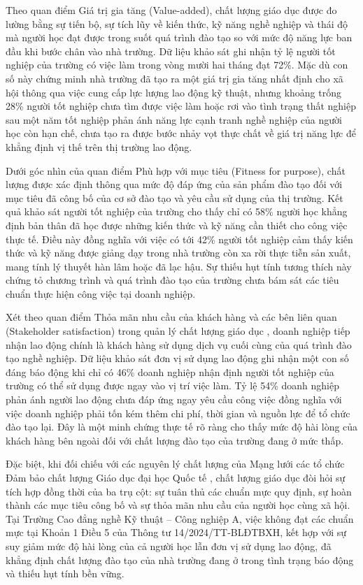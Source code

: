 Theo quan điểm Giá trị gia tăng (Value-added), chất lượng giáo dục được đo lường bằng sự tiến bộ, sự tích lũy về kiến thức, kỹ năng nghề nghiệp và thái độ mà người học đạt được trong suốt quá trình đào tạo so với mức độ năng lực ban đầu khi bước chân vào nhà trường. Dữ liệu khảo sát ghi nhận tỷ lệ người tốt nghiệp của trường có việc làm trong vòng mười hai tháng đạt 72\%. Mặc dù con số này chứng minh nhà trường đã tạo ra một giá trị gia tăng nhất định cho xã hội thông qua việc cung cấp lực lượng lao động kỹ thuật, nhưng khoảng trống 28\% người tốt nghiệp chưa tìm được việc làm hoặc rơi vào tình trạng thất nghiệp sau một năm tốt nghiệp phản ánh năng lực cạnh tranh nghề nghiệp của người học còn hạn chế, chưa tạo ra được bước nhảy vọt thực chất về giá trị năng lực để khẳng định vị thế trên thị trường lao động.

Dưới góc nhìn của quan điểm Phù hợp với mục tiêu (Fitness for purpose), chất lượng được xác định thông qua mức độ đáp ứng của sản phẩm đào tạo đối với mục tiêu đã công bố của cơ sở đào tạo và yêu cầu sử dụng của thị trường. Kết quả khảo sát người tốt nghiệp của trường cho thấy chỉ có 58\% người học khẳng định bản thân đã học được những kiến thức và kỹ năng cần thiết cho công việc thực tế. Điều này đồng nghĩa với việc có tới 42\% người tốt nghiệp cảm thấy kiến thức và kỹ năng được giảng dạy trong nhà trường còn xa rời thực tiễn sản xuất, mang tính lý thuyết hàn lâm hoặc đã lạc hậu. Sự thiếu hụt tính tương thích này chứng tỏ chương trình và quá trình đào tạo của trường chưa bám sát các tiêu chuẩn thực hiện công việc tại doanh nghiệp.

Xét theo quan điểm Thỏa mãn nhu cầu của khách hàng và các bên liên quan (Stakeholder satisfaction) trong quản lý chất lượng giáo dục \parencite{sallis2002, tribus1993}, doanh nghiệp tiếp nhận lao động chính là khách hàng sử dụng dịch vụ cuối cùng của quá trình đào tạo nghề nghiệp. Dữ liệu khảo sát đơn vị sử dụng lao động ghi nhận một con số đáng báo động khi chỉ có 46\% doanh nghiệp nhận định người tốt nghiệp của trường có thể sử dụng được ngay vào vị trí việc làm. Tỷ lệ 54\% doanh nghiệp phản ánh người lao động chưa đáp ứng ngay yêu cầu công việc đồng nghĩa với việc doanh nghiệp phải tốn kém thêm chi phí, thời gian và nguồn lực để tổ chức đào tạo lại. Đây là một minh chứng thực tế rõ ràng cho thấy mức độ hài lòng của khách hàng bên ngoài đối với chất lượng đào tạo của trường đang ở mức thấp.

Đặc biệt, khi đối chiếu với các nguyên lý chất lượng của Mạng lưới các tổ chức Đảm bảo chất lượng Giáo dục đại học Quốc tế \parencite{inqaahe2018}, chất lượng giáo dục đòi hỏi sự tích hợp đồng thời của ba trụ cột: sự tuân thủ các chuẩn mực quy định, sự hoàn thành các mục tiêu công bố và sự thỏa mãn nhu cầu của người học cùng xã hội. Tại Trường Cao đẳng nghề Kỹ thuật -- Công nghiệp A, việc không đạt các chuẩn mực tại Khoản 1 Điều 5 của Thông tư 14/2024/TT-BLĐTBXH, kết hợp với sự suy giảm mức độ hài lòng của cả người học lẫn đơn vị sử dụng lao động, đã khẳng định chất lượng đào tạo của nhà trường đang ở trong tình trạng báo động và thiếu hụt tính bền vững.

